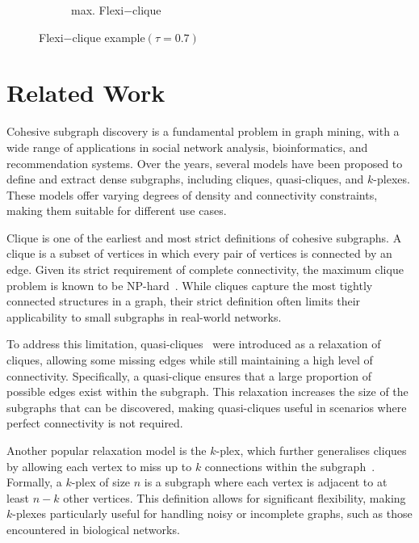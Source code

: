 \documentclass[sigconf]{acmart}
\newcommand{\flexi}{\textsf{Flexi$-$clique}}
\begin{document}
\begin{figure}[t]
\begin{subfigure}{.32\linewidth}
\vspace{-0.2cm}
\caption{max. {\flexi} }
\label{fig:maximum}
\end{subfigure}
\vspace{-0.3cm}
\caption{{\flexi} example$(\tau =0.7)$}
\vspace{-0.45cm}
\label{fig:example}
\end{figure}


\section{Related Work}

Cohesive subgraph discovery is a fundamental problem in graph mining, with a wide range of applications in social network analysis, bioinformatics, and recommendation systems. Over the years, several models have been proposed to define and extract dense subgraphs, including cliques, quasi-cliques, and $k$-plexes. These models offer varying degrees of density and connectivity constraints, making them suitable for different use cases.

Clique is one of the earliest and most strict definitions of cohesive subgraphs. A clique is a subset of vertices in which every pair of vertices is connected by an edge. Given its strict requirement of complete connectivity, the maximum clique problem is known to be NP-hard~\cite{karp2010reducibility}. While cliques capture the most tightly connected structures in a graph, their strict definition often limits their applicability to small subgraphs in real-world networks.

To address this limitation, quasi-cliques~\cite{abello2002massive} were introduced as a relaxation of cliques, allowing some missing edges while still maintaining a high level of connectivity. Specifically, a quasi-clique ensures that a large proportion of possible edges exist within the subgraph. This relaxation increases the size of the subgraphs that can be discovered, making quasi-cliques useful in scenarios where perfect connectivity is not required.

Another popular relaxation model is the $k$-plex, which further generalises cliques by allowing each vertex to miss up to $k$ connections within the subgraph~\cite{seidman1978graph}. Formally, a $k$-plex of size $n$ is a subgraph where each vertex is adjacent to at least $n - k$ other vertices. This definition allows for significant flexibility, making $k$-plexes particularly useful for handling noisy or incomplete graphs, such as those encountered in biological networks.
\end{document}
